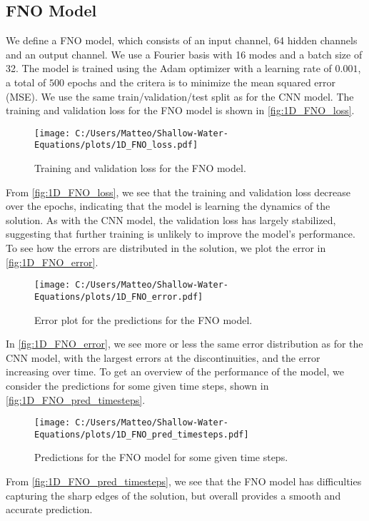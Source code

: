 \subsection*{FNO Model}
We define a FNO model, which consists of an input channel, 64 hidden channels and an output channel. We use a Fourier basis with 16 modes and a batch size of 32.
The model is trained using the Adam optimizer with a learning rate of $0.001$, a total of $500$ epochs and the critera is to minimize the mean squared error (MSE).
We use the same train/validation/test split as for the CNN model.
The training and validation loss for the FNO model is shown in \autoref{fig:1D_FNO_loss}.
\begin{figure}[H]
    \centering
    \texttt{[image: C:/Users/Matteo/Shallow-Water-Equations/plots/1D\_FNO\_loss.pdf]}
    \caption{Training and validation loss for the FNO model.}\label{fig:1D_FNO_loss}
\end{figure}
From \autoref{fig:1D_FNO_loss}, we see that the training and validation loss decrease over the epochs, indicating that the model is learning the dynamics of the solution.
As with the CNN model, the validation loss has largely stabilized, suggesting that further training is unlikely to improve the model's performance.
To see how the errors are distributed in the solution, we plot the error in \autoref{fig:1D_FNO_error}.
\begin{figure}[H]
    \centering
    \texttt{[image: C:/Users/Matteo/Shallow-Water-Equations/plots/1D\_FNO\_error.pdf]}
    \caption{Error plot for the predictions for the FNO model.}\label{fig:1D_FNO_error}
\end{figure}
In \autoref{fig:1D_FNO_error}, we see more or less the same error distribution as for the CNN model, with the largest errors at the discontinuities, and the error increasing over time.
To get an overview of the performance of the model, we consider the predictions for some given time steps, shown in \autoref{fig:1D_FNO_pred_timesteps}.
\begin{figure}[H]
    \centering
    \texttt{[image: C:/Users/Matteo/Shallow-Water-Equations/plots/1D\_FNO\_pred\_timesteps.pdf]}
    \caption{Predictions for the FNO model for some given time steps.}\label{fig:1D_FNO_pred_timesteps}
\end{figure}
From \autoref{fig:1D_FNO_pred_timesteps}, we see that the FNO model has difficulties capturing the sharp edges of the solution, but overall provides a smooth and accurate prediction.

